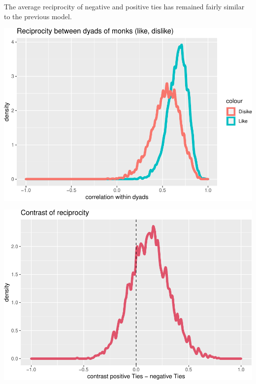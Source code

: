\documentclass[
]{article}
\newenvironment{Shaded}{\begin{snugshade}}{\end{snugshade}}
\newcommand{\AttributeTok}[1]{\textcolor[rgb]{0.77,0.63,0.00}{#1}}
\newcommand{\DecValTok}[1]{\textcolor[rgb]{0.00,0.00,0.81}{#1}}
\newcommand{\FunctionTok}[1]{\textcolor[rgb]{0.00,0.00,0.00}{#1}}
\newcommand{\NormalTok}[1]{#1}
\newcommand{\OtherTok}[1]{\textcolor[rgb]{0.56,0.35,0.01}{#1}}
\newcommand{\SpecialCharTok}[1]{\textcolor[rgb]{0.00,0.00,0.00}{#1}}
\begin{document}
The average reciprocity of negative and positive ties has remained
fairly similar to the previous model.

\begin{Shaded}
\end{Shaded}

\begin{center}\includegraphics{Geraldes-week08_files/figure-latex/unnamed-chunk-17-1} \end{center}

\begin{center}\includegraphics{Geraldes-week08_files/figure-latex/unnamed-chunk-17-2} \end{center}
\end{document}

